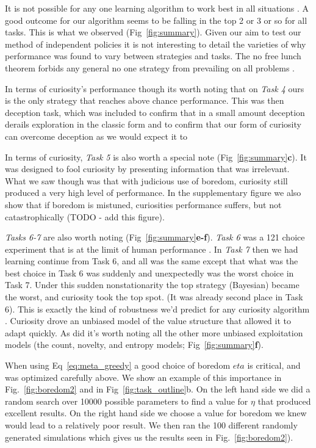 It is not possible for any one learning algorithm to work best in all situations \cite{needed}. A good outcome for our algorithm seems to be falling in the top 2 or 3 or so for all tasks. This is what we observed (Fig~\ref{fig:summary}). Given our aim to test our method of independent policies it is not interesting to detail the varieties of why performance was found to vary between strategies and tasks. The no free lunch theorem forbids any general no one strategy from prevailing on all problems \cite{needed}. 

In terms of curiosity's performance though its worth noting that on \textit{Task 4} ours is the only strategy that reaches above chance performance. This was then deception task, which was included to confirm that in a small amount deception derails exploration in the classic form and to confirm that our form of curiosity can overcome deception as we would expect it to 

In terms of curiosity, \textit{Task 5} is also worth a special note (Fig~\ref{fig:summary}\textbf{c}). It was designed to fool curiosity by presenting information that was irrelevant. What we saw though was that with judicious use of boredom, curiosity still produced a very high level of performance. In the supplementary figure we also show that if boredom is mistuned, curiosities performance suffers, but not catastrophically (TODO - add this figure). 

\textit{Tasks 6-7} are also worth noting (Fig~\ref{fig:summary}\textbf{e-f}). \textit{Task 6} was a 121 choice experiment that is at the limit of human performance \cite{needed}. In \textit{Task 7} then we had learning continue from Task 6, and all was the same except that what was the best choice in Task 6 was suddenly and unexpectedly was the worst choice in Task 7. Under this sudden nonstationarity the top strategy (Bayesian) became the worst, and curiosity took the top spot. (It was already second place in Task 6). This is exactly the kind of robustness we'd predict for any curiosity algorithm \cite{needed}. Curiosity drove an unbiased model of the value structure that allowed it to adapt quickly. As did it's worth noting all the other more unbiased exploitation models (the count, novelty, and entropy models; Fig~\ref{fig:summary}\textbf{f}).

When using Eq~\ref{eq:meta_greedy} a good choice of boredom $eta$ is critical, and was optimized carefully above. We show an example of this importance in Fig.~\ref{fig:boredom2} and in Fig~\ref{fig:task_outline}b. On the left hand side we did a random search over 10000 possible parameters to find a value for $\eta$ that produced excellent results. On the right hand side we choose a value for boredom we knew would lead to a relatively poor result. We then ran the 100 different randomly generated simulations which gives us the results seen in Fig.~\ref{fig:boredom2}). 

